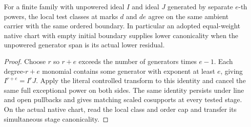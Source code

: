 \begin{theorem}
\label{hir:g8-native-finite-power-reduction}
\leanok
For a finite family with unpowered ideal $I$ and ideal $J$
generated by separate $e$-th powers, the local test classes at
marks $d$ and $de$ agree on the same ambient carrier with the
same ordered boundary. In particular an adopted equal-weight
native chart with empty initial boundary supplies lower
canonicality when the unpowered generator span is its actual
lower residual.
\end{theorem}
\begin{proof}
Choose $r$ so $r+e$ exceeds the number of generators times
$e-1$. Each degree-$r+e$ monomial contains some generator
with exponent at least $e$, giving $I^{r+e}=I^rJ$.
Apply the literal controlled transform to this identity and
cancel the same full exceptional power on both sides. The
same identity persists under line and open pullbacks and
gives matching scaled cosupports at every tested stage.
On the actual native chart, read the local class and order
cap and transfer its simultaneous stage canonicality.
\end{proof}

